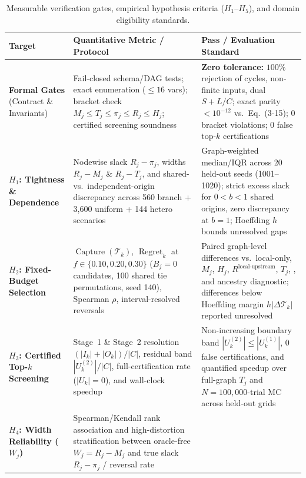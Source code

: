 \begin{table}[htbp]
\centering
\caption{Measurable verification gates, empirical hypothesis criteria ($H_1$--$H_5$), and domain eligibility standards.}
\label{tab:evaluation-criteria}
\footnotesize
\renewcommand{\arraystretch}{1.12}
\begin{tabularx}{\textwidth}{@{}>{\raggedright\arraybackslash}p{2.65cm} L L@{}}
\toprule
Target & Quantitative Metric / Protocol & Pass / Evaluation Standard \\
\midrule
\textbf{Formal Gates} \newline (Contract \& Invariants) &
Fail-closed schema/DAG tests; exact enumeration ($\le 16$ vars); bracket check $M_j \le T_j \le \pi_j \le R_j \le H_j$; certified screening soundness &
\textbf{Zero tolerance:} $100\%$ rejection of cycles, non-finite inputs, dual $S{+}L/C$; exact parity $<10^{-12}$ vs.\ Eq.~(3-15); $0$ bracket violations; $0$ false top-$k$ certifications \\
\addlinespace
\textbf{$H_1$: Tightness \& Dependence} &
Nodewise slack $R_j-\pi_j$, widths $R_j-M_j$ \& $R_j-T_j$, and shared- vs.\ independent-origin discrepancy across 560 branch + 3,600 uniform + 144 hetero scenarios &
Graph-weighted median/IQR across 20 held-out seeds (1001--1020); strict excess slack for $0<b<1$ shared origins, zero discrepancy at $b=1$; Hoeffding $h$ bounds unresolved gaps \\
\addlinespace
\textbf{$H_2$: Fixed-Budget Selection} &
$\operatorname{Capture}(\mathcal{T}_k)$, $\operatorname{Regret}_k$ at $f\in\{0.10,0.20,0.30\}$ ($B_j=0$ candidates, 100 shared tie permutations, seed 140), Spearman $\rho$, interval-resolved reversals &
Paired graph-level differences vs.\ local-only, $M_j$, $H_j$, $R^{\mathrm{local\text{-}upstream}}$, $T_j$, \citet{abbe2020}, and ancestry diagnostic; differences below Hoeffding margin $h|\Delta\mathcal{T}_k|$ reported unresolved \\
\addlinespace
\textbf{$H_3$: Certified Top-$k$ Screening} &
Stage~1 \& Stage~2 resolution $(|I_k|+|O_k|)/|C|$, residual band $|U_k^{(2)}|/|C|$, full-certification rate ($|U_k|=0$), and wall-clock speedup &
Non-increasing boundary band $|U_k^{(2)}|\le |U_k^{(1)}|$, $0$ false certifications, and quantified speedup over full-graph $T_j$ and $N=100{,}000$-trial MC across held-out grids \\
\addlinespace
\textbf{$H_4$: Width Reliability ($W_j$)} &
Spearman/Kendall rank association and high-distortion stratification between oracle-free $W_j=R_j-M_j$ and true slack $R_j-\pi_j$ / reversal rate &

\end{tabularx}
\end{table}

